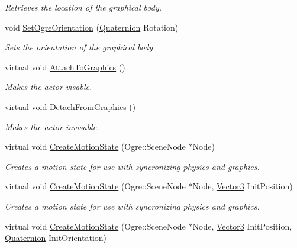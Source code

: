 \begin{DoxyCompactItemize}
\begin{DoxyCompactList}\small\item\em Retrieves the location of the graphical body. \item\end{DoxyCompactList}\item 
void \hyperlink{classphys_1_1ActorBase_a7b2d13cb1e8bba60eeae782a53fd5e49}{SetOgreOrientation} (\hyperlink{classphys_1_1Quaternion}{Quaternion} Rotation)
\begin{DoxyCompactList}\small\item\em Sets the orientation of the graphical body. \item\end{DoxyCompactList}\item 
virtual void \hyperlink{classphys_1_1ActorBase_a45f190cb9b647bb3385d1298f9dab589}{AttachToGraphics} ()
\begin{DoxyCompactList}\small\item\em Makes the actor visable. \item\end{DoxyCompactList}\item 
virtual void \hyperlink{classphys_1_1ActorBase_acc352d14b6d7f15694ea108ec1c281ec}{DetachFromGraphics} ()
\begin{DoxyCompactList}\small\item\em Makes the actor invisable. \item\end{DoxyCompactList}\item 
virtual void \hyperlink{classphys_1_1ActorBase_a23e6edcd5c18b89c40abf02feba6bc11}{CreateMotionState} (Ogre::SceneNode $\ast$Node)
\begin{DoxyCompactList}\small\item\em Creates a motion state for use with syncronizing physics and graphics. \item\end{DoxyCompactList}\item 
virtual void \hyperlink{classphys_1_1ActorBase_a5bc2f834d7994c3c6a9408f4ff699f59}{CreateMotionState} (Ogre::SceneNode $\ast$Node, \hyperlink{classphys_1_1Vector3}{Vector3} InitPosition)
\begin{DoxyCompactList}\small\item\em Creates a motion state for use with syncronizing physics and graphics. \item\end{DoxyCompactList}\item 
virtual void \hyperlink{classphys_1_1ActorBase_ae002dd16cd0d7d2c3d3098f85920ae02}{CreateMotionState} (Ogre::SceneNode $\ast$Node, \hyperlink{classphys_1_1Vector3}{Vector3} InitPosition, \hyperlink{classphys_1_1Quaternion}{Quaternion} InitOrientation)

\end{DoxyCompactItemize}
